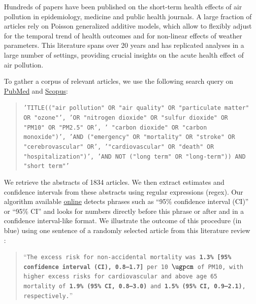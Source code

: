 \documentclass[12pt]{article}
\begin{document}
        Hundreds of papers have been published on the short-term health effects of air pollution in epidemiology, medicine and public health journals. A large fraction of articles rely on Poisson generalized additive models, which allow to flexibly adjust for the temporal trend of health outcomes and for non-linear effects of weather parameters. This literature spans over 20 years and has replicated analyses in a large number of settings, providing crucial insights on the acute health effect of air pollution. 
    
        To gather a corpus of relevant articles, we use the following search query on \href{https://www.ncbi.nlm.nih.gov/}{PubMed} and \href{https://www.scopus.com/home.uri}{Scopus}:
               
        \begin{quote}
       \footnotesize\texttt{'TITLE(("air pollution" OR "air quality" OR "particulate matter" OR "ozone"', 'OR "nitrogen dioxide" OR "sulfur dioxide" OR "PM10" OR "PM2.5" OR', ' "carbon dioxide" OR "carbon monoxide")',  'AND ("emergency" OR "mortality" OR "stroke" OR "cerebrovascular" OR', '"cardiovascular" OR "death" OR "hospitalization")', 'AND NOT ("long term" OR "long-term")) AND "short term"'}
        \end{quote}

       \noindent We retrieve the abstracts of 1834 articles. We then extract estimates and confidence intervals from these abstracts using regular expressions (regex). Our algorithm available \href{https://vincentbagilet.github.io/inference_pollution/automatic_lit_review_getting_abstracts.html}{online} detects phrases such as “95\% confidence interval (CI)” or “95\% CI” and looks for numbers directly before this phrase or after and in a confidence interval-like format. We illustrate the outcome of this procedure (in blue) using one sentence of a randomly selected article from this literature review \citep{vichit-vadakan_public_2008}:
        
\begin{sloppypar}
        \begin{quote}
         \footnotesize    “\texttt{The excess risk for non-accidental mortality was \textbf{\color{cerulean}1.3\% [95\% confidence interval (CI), 0.8–1.7]} per 10 $\si{\ugpcm}$ of PM10, with higher excess risks for cardiovascular and above age 65 mortality of \textbf{\color{cerulean}1.9\% (95\% CI, 0.8–3.0)} and \textbf{\color{cerulean}1.5\% (95\% CI, 0.9–2.1)}, respectively.}”
        \end{quote}
\end{sloppypar}
\end{document}
